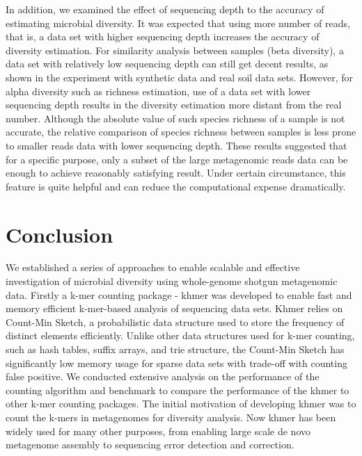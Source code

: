 \documentclass{article}
\begin{document}
In addition, we examined the effect of sequencing depth to the accuracy of 
estimating microbial diversity.
It was expected that using more number of reads, that is, a data set with higher sequencing
depth increases the accuracy of diversity estimation. For similarity analysis 
between samples (beta diversity), a data set with relatively
low sequencing depth can still get decent results, as shown in the experiment
with synthetic data and real soil data sets. However, for alpha diversity such as richness
estimation, use of a data set with lower sequencing depth results in the diversity estimation
more distant from the real number. Although the absolute value of such species
richness of a sample is not accurate, the relative comparison of species
richness between samples is less prone to smaller reads data with lower
sequencing depth. These results suggested that for a specific
purpose, only a subset of the large metagenomic reads data can be enough to
achieve reasonably satisfying result. Under certain circumstance, this feature
is quite helpful and can reduce the computational expense dramatically. 

\section{Conclusion}
%
%

We established a series of approaches to enable scalable and effective
investigation of microbial diversity using whole-genome shotgun metagenomic
data. Firstly a k-mer counting package - khmer was developed to enable fast and
memory efficient k-mer-based analysis of sequencing data sets\cite{Zhang2014,khmer}. Khmer relies on 
Count-Min Sketch, a probabilistic data structure used to store the frequency of 
distinct elements efficiently. Unlike other data structures used for k-mer 
counting, such as hash tables, suffix arrays, and trie structure, the Count-Min
Sketch has significantly low memory usage for sparse data sets with trade-off 
with counting false positive. We conducted extensive analysis on the
performance of the counting algorithm and benchmark to compare the performance
of the khmer to other k-mer counting packages. The initial motivation of
developing khmer was to count the k-mers in metagenomes for diversity
analysis. Now khmer has been widely used for many other purposes, from enabling
large scale de novo metagenome assembly to sequencing error detection and
correction.
\end{document}
